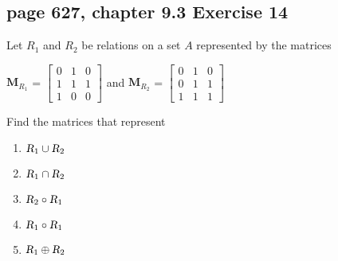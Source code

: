 \documentclass[sigconf]{acmart}
\begin{document}
\subsection{page 627, chapter 9.3 Exercise 14}
\begin{shaded}
    Let $R_1$ and $R_2$ be relations on a set $A$ represented by the matrices\\
    \begin{center}
        $\textbf{M}_{R_1}$ = 
        $
    	\begin{bmatrix}
    	   0 & 1 & 0 \\
     	   1 & 1 & 1 \\
     	   1 & 0 & 0
    	\end{bmatrix}
    	$
    	and
    	$\textbf{M}_{R_2}$ = 
        $
    	\begin{bmatrix}
    	   0 & 1 & 0 \\
     	   0 & 1 & 1 \\
     	   1 & 1 & 1
    	\end{bmatrix}
    	$
    \end{center}
	Find the matrices that represent
	\begin{enumerate}[label=(\alph*)]
        \item $\textsl{R}_1 \cup \textsl{R}_2$
        \item $\textsl{R}_1 \cap \textsl{R}_2$
        \item $\textsl{R}_2 \circ \textsl{R}_1$
        \item $\textsl{R}_1 \circ \textsl{R}_1$
        \item $\textsl{R}_1 \oplus \textsl{R}_2$
    \end{enumerate}
\end{shaded}
\end{document}
